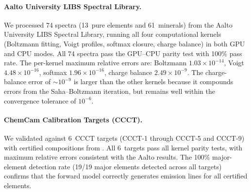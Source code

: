 \documentclass[preprint,12pt,authoryear]{elsarticle}
\begin{document}
\paragraph{Aalto University LIBS Spectral Library.}
We processed 74 spectra (13~pure elements and 61~minerals) from the Aalto University LIBS Spectral Library, running all four computational kernels (Boltzmann fitting, Voigt profiles, softmax closure, charge balance) in both GPU and CPU modes.
All 74 spectra pass the GPU--CPU parity test with 100\% pass rate.
The per-kernel maximum relative errors are: Boltzmann $1.03 \times 10^{-14}$, Voigt $4.48 \times 10^{-16}$, softmax $1.96 \times 10^{-16}$, charge balance $2.49 \times 10^{-9}$.
The charge-balance error of $\sim 10^{-9}$ is larger than the other kernels because it compounds errors from the Saha--Boltzmann iteration, but remains well within the convergence tolerance of $10^{-6}$.

\paragraph{ChemCam Calibration Targets (CCCT).}
We validated against 6~CCCT targets (CCCT-1 through CCCT-5 and CCCT-9) with certified compositions from \citet{Fabre2011}.
All 6~targets pass all kernel parity tests, with maximum relative errors consistent with the Aalto results.
The 100\% major-element detection rate (19/19 major elements detected across all targets) confirms that the forward model correctly generates emission lines for all certified elements.

\end{document}
